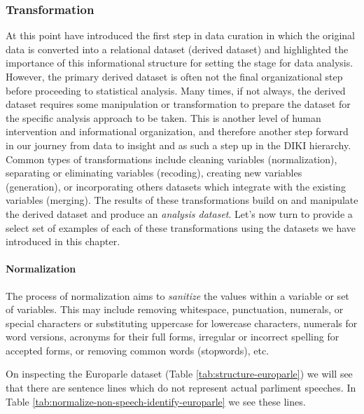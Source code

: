 \documentclass[
]{article}
\begin{document}
\hypertarget{transformation}{%
\subsubsection{Transformation}\label{transformation}}

At this point have introduced the first step in data curation in which the original data is converted into a relational dataset (derived dataset) and highlighted the importance of this informational structure for setting the stage for data analysis. However, the primary derived dataset is often not the final organizational step before proceeding to statistical analysis. Many times, if not always, the derived dataset requires some manipulation or transformation to prepare the dataset for the specific analysis approach to be taken. This is another level of human intervention and informational organization, and therefore another step forward in our journey from data to insight and as such a step up in the DIKI hierarchy. Common types of transformations include cleaning variables (normalization), separating or eliminating variables (recoding), creating new variables (generation), or incorporating others datasets which integrate with the existing variables (merging). The results of these transformations build on and manipulate the derived dataset and produce an \emph{analysis dataset}. Let's now turn to provide a select set of examples of each of these transformations using the datasets we have introduced in this chapter.

\hypertarget{normalization}{%
\paragraph{Normalization}\label{normalization}}

The process of normalization aims to \emph{sanitize} the values within a variable or set of variables. This may include removing whitespace, punctuation, numerals, or special characters or substituting uppercase for lowercase characters, numerals for word versions, acronyms for their full forms, irregular or incorrect spelling for accepted forms, or removing common words (stopwords), etc.

On inspecting the Europarle dataset (Table \ref{tab:structure-europarle}) we will see that there are sentence lines which do not represent actual parliment speeches. In Table \ref{tab:normalize-non-speech-identify-europarle} we see these lines.
\end{document}
